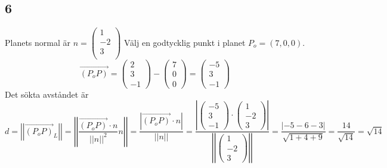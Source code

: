 \documentclass{article}
\begin{document}
\subsection*{6}
Planets normal är 
$
n = \begin{pmatrix}
        1 \\
        -2 \\
        3 \\
    \end{pmatrix}
$
Välj en godtycklig punkt i planet $P_o = (7,0,0)$. 
$$
\vec{(P_oP)} = \begin{pmatrix} 2 \\ 3 \\ -1 \end{pmatrix} - \begin{pmatrix} 7 \\ 0 \\ 0 \end{pmatrix} = \begin{pmatrix} -5 \\ 3 \\ -1 \end{pmatrix}
$$
Det sökta avståndet är
$$d = \left | \left | \vec{(P_oP)}_L \right | \right | = 
\left | \left | \frac{\vec{(P_oP)} \cdot n}{{\left | \left | n \right | \right |}^2} n \right | \right | = 
\frac{\left | \vec{(P_oP)} \cdot n \right |}{\left| \left | n \right | \right |} = 
\frac{\left | \begin{pmatrix} -5 \\ 3 \\ -1 \end{pmatrix} \cdot \begin{pmatrix} 1 \\ -2 \\ 3 \end{pmatrix} \right |}{\left | \left | \begin{pmatrix} 1 \\ -2 \\ 3 \end{pmatrix} \right | \right |} = 
\frac{\left | -5 -6 -3 \right |}{\sqrt{1+4+9}} = 
\frac{14}{\sqrt{14}} = 
\sqrt{14}
$$
\end{document}
